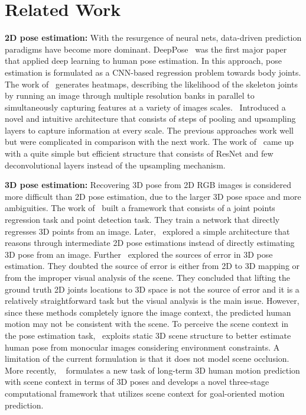 \documentclass[10pt,twocolumn,letterpaper]{article}
\begin{document}
\section{Related Work}
\textbf{2D pose estimation: }With the resurgence of neural nets, data-driven prediction paradigms have become more dominant. DeepPose~\cite{toshev2014deeppose} was the first major paper that applied deep learning to human pose estimation. In this approach, pose estimation is formulated as a CNN-based regression problem towards body joints. The work of~\cite{tompson2015efficient} generates heatmaps, describing the likelihood of the skeleton joints by running an image through multiple resolution banks in parallel to simultaneously capturing features at a variety of images scales.~\cite{newell2016stacked} Introduced a novel and intuitive architecture that consists of steps of pooling and upsampling layers to capture information at every scale. The previous approaches work well but were complicated in comparison with the next work. The work of~\cite{xiao2018simple} came up with a quite simple but efficient structure that consists of ResNet and few deconvolutional layers instead of the upsampling mechanism.

\textbf{3D pose estimation: }Recovering 3D pose from 2D RGB images is considered more difficult than 2D pose estimation, due to the larger 3D pose space and more ambiguities. The work of~\cite{li20143d} built a framework that consists of a joint points regression task and point detection task. They train a network that directly regresses 3D points from an image. Later,~\cite{chen20173d} explored a simple architecture that reasons through intermediate 2D pose estimations instead of directly estimating 3D pose from an image. Further~\cite{martinez2017simple} explored the sources of error in 3D pose estimation. They doubted the source of error is either from 2D to 3D mapping or from the improper visual analysis of the scene. They concluded that lifting the ground truth 2D joints locations to 3D space is not the source of error and it is a relatively straightforward task but the visual analysis is the main issue. However, since these methods completely ignore the image context, the predicted human motion may not be consistent with the scene. To perceive the scene context in the pose estimation task,~\cite{hassan2019resolving} exploits static 3D scene structure to better estimate human pose from monocular images considering environment constraints. A limitation of the current formulation is that it does not model scene occlusion. More recently, ~\cite{cao2020long} formulates a new task of long-term 3D human motion prediction with scene context in terms of 3D poses and develops a novel three-stage computational framework that utilizes scene context for goal-oriented motion prediction.
\end{document}
